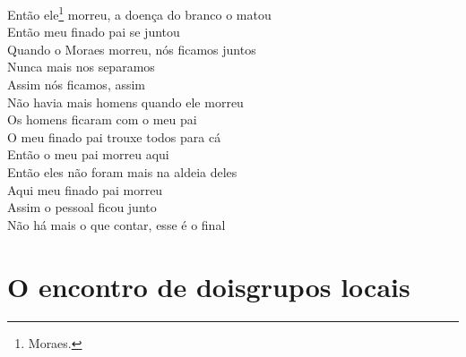 \begin{linenumbers}
 
\noindent   Então ele\footnote{Moraes.} morreu, a doença do branco o matou\\
  Então meu finado pai se juntou\\
  Quando o Moraes morreu, nós ficamos juntos\\
  Nunca mais nos separamos\\
  Assim nós ficamos, assim\\
  Não havia mais homens quando ele morreu\\
  Os homens ficaram com o meu pai\\
  O meu finado pai trouxe todos para cá\\
  Então o meu pai morreu aqui\\
  Então eles não foram mais na aldeia deles\\
  Aqui meu finado pai morreu\\
  Assim o pessoal ficou junto\\
  Não há mais o que contar, esse é o final
\end{linenumbers}

\chapter[O encontro de dois grupos locais]{O encontro de dois\break grupos locais}

